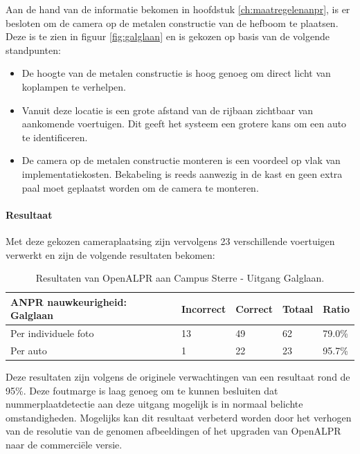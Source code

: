 Aan de hand van de informatie bekomen in hoofdstuk \ref{ch:maatregelenanpr}, is er besloten om de camera op de metalen constructie van de hefboom te plaatsen. Deze is te zien in figuur \ref{fig:galglaan} en is gekozen op basis van de volgende standpunten:
\begin{itemize}
	\item De hoogte van de metalen constructie is hoog genoeg om direct licht van koplampen te verhelpen.
	\item Vanuit deze locatie is een grote afstand van de rijbaan zichtbaar van aankomende voertuigen. Dit geeft het systeem een grotere kans om een auto te identificeren.
	\item De camera op de metalen constructie monteren is een voordeel op vlak van implementatiekosten. Bekabeling is reeds aanwezig in de kast en geen extra paal moet geplaatst worden om de camera te monteren.
\end{itemize}

\paragraph{Resultaat}
Met deze gekozen cameraplaatsing zijn vervolgens 23 verschillende voertuigen verwerkt en zijn de volgende resultaten bekomen:
\begin{table}[h!]
	\centering
	\begin{tabular}{l|l|l|l|l}
\textbf{ANPR nauwkeurigheid: Galglaan} & Incorrect & Correct & Totaal & Ratio	\\ \hline
Per individuele foto 	& 13 & 49	& 62	& 79.0\%\\
Per auto				& 1 & 22	& 23 	& 95.7\%\\
\end{tabular}
\caption{Resultaten van OpenALPR aan Campus Sterre - Uitgang Galglaan.}
\label{tab:anprgalglaan}
\end{table}

Deze resultaten zijn volgens de originele verwachtingen van een resultaat rond de 95\%. Deze foutmarge is laag genoeg om te kunnen besluiten dat nummerplaatdetectie aan deze uitgang mogelijk is in normaal belichte omstandigheden. Mogelijks kan dit resultaat verbeterd worden door het verhogen van de resolutie van de genomen afbeeldingen of het upgraden van OpenALPR naar de commerciële versie.

